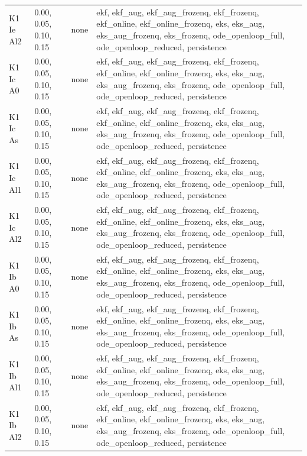 \begin{table}[t]
\begin{tabular}{llll}
K1 Ie Al2 & 0.00, 0.05, 0.10, 0.15 & none & ekf, ekf\_aug, ekf\_aug\_frozenq, ekf\_frozenq, ekf\_online, ekf\_online\_frozenq, eks, eks\_aug, eks\_aug\_frozenq, eks\_frozenq, ode\_openloop\_full, ode\_openloop\_reduced, persistence \\
K1 Ic A0 & 0.00, 0.05, 0.10, 0.15 & none & ekf, ekf\_aug, ekf\_aug\_frozenq, ekf\_frozenq, ekf\_online, ekf\_online\_frozenq, eks, eks\_aug, eks\_aug\_frozenq, eks\_frozenq, ode\_openloop\_full, ode\_openloop\_reduced, persistence \\
K1 Ic As & 0.00, 0.05, 0.10, 0.15 & none & ekf, ekf\_aug, ekf\_aug\_frozenq, ekf\_frozenq, ekf\_online, ekf\_online\_frozenq, eks, eks\_aug, eks\_aug\_frozenq, eks\_frozenq, ode\_openloop\_full, ode\_openloop\_reduced, persistence \\
K1 Ic Al1 & 0.00, 0.05, 0.10, 0.15 & none & ekf, ekf\_aug, ekf\_aug\_frozenq, ekf\_frozenq, ekf\_online, ekf\_online\_frozenq, eks, eks\_aug, eks\_aug\_frozenq, eks\_frozenq, ode\_openloop\_full, ode\_openloop\_reduced, persistence \\
K1 Ic Al2 & 0.00, 0.05, 0.10, 0.15 & none & ekf, ekf\_aug, ekf\_aug\_frozenq, ekf\_frozenq, ekf\_online, ekf\_online\_frozenq, eks, eks\_aug, eks\_aug\_frozenq, eks\_frozenq, ode\_openloop\_full, ode\_openloop\_reduced, persistence \\
K1 Ib A0 & 0.00, 0.05, 0.10, 0.15 & none & ekf, ekf\_aug, ekf\_aug\_frozenq, ekf\_frozenq, ekf\_online, ekf\_online\_frozenq, eks, eks\_aug, eks\_aug\_frozenq, eks\_frozenq, ode\_openloop\_full, ode\_openloop\_reduced, persistence \\
K1 Ib As & 0.00, 0.05, 0.10, 0.15 & none & ekf, ekf\_aug, ekf\_aug\_frozenq, ekf\_frozenq, ekf\_online, ekf\_online\_frozenq, eks, eks\_aug, eks\_aug\_frozenq, eks\_frozenq, ode\_openloop\_full, ode\_openloop\_reduced, persistence \\
K1 Ib Al1 & 0.00, 0.05, 0.10, 0.15 & none & ekf, ekf\_aug, ekf\_aug\_frozenq, ekf\_frozenq, ekf\_online, ekf\_online\_frozenq, eks, eks\_aug, eks\_aug\_frozenq, eks\_frozenq, ode\_openloop\_full, ode\_openloop\_reduced, persistence \\
K1 Ib Al2 & 0.00, 0.05, 0.10, 0.15 & none & ekf, ekf\_aug, ekf\_aug\_frozenq, ekf\_frozenq, ekf\_online, ekf\_online\_frozenq, eks, eks\_aug, eks\_aug\_frozenq, eks\_frozenq, ode\_openloop\_full, ode\_openloop\_reduced, persistence \\
\bottomrule
\end{tabular}
\end{table}
